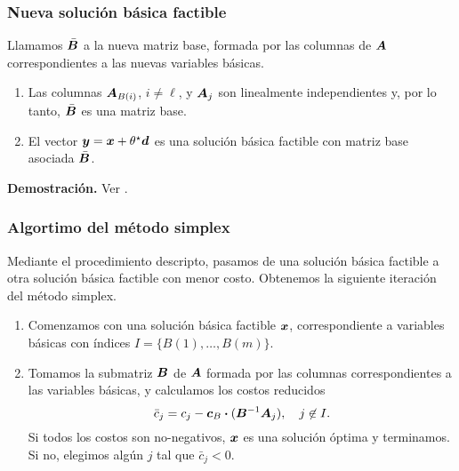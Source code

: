\documentclass[aspectratio=169,12pt,spanish]{beamer}
\newcounter{savedenum}
\newcommand*{\saveenum}{\setcounter{savedenum}{\theenumi}}
\begin{document}

\begin{frame}
\frametitle{Nueva solución básica factible}

Llamamos $\bar {\bm{B}}$ a la nueva matriz base, formada por las columnas de $\bm{A}$ correspondientes a las nuevas variables básicas.

\begin{theorem}
\begin{enumerate}
\item Las columnas $\bm{A}_{B(i)}$, $i \neq \ell$, y $\bm{A}_j$ son linealmente independientes y, por lo tanto, $\bar {\bm{B}}$ es una matriz base.
\item El vector $\bm{y} = \bm{x} + \theta^\star \bm{d}$ es una solución básica factible con matriz base asociada $\bar {\bm{B}}$.
\end{enumerate}
\end{theorem}

\textbf{Demostración.} Ver \cite[Teorema 3.2]{Bertsimas1997}.

\end{frame}


\begin{frame}
\frametitle{Algortimo del método simplex}

Mediante el procedimiento descripto, pasamos de una solución básica factible a otra solución básica factible con menor costo.
Obtenemos la siguiente iteración del método simplex.

\begin{enumerate}
\item Comenzamos con una solución básica factible $\bm{x}$, correspondiente a variables básicas con índices $I = \{B(1), \dots, B(m)\}$.
\item Tomamos la submatriz $\bm{B}$ de $\bm{A}$ formada por las columnas correspondientes a las variables básicas, y calculamos los costos reducidos
    $$\bar c_j = c_j - \bm{c}_B \boldsymbol{\cdot} (\bm{B}^{-1} \bm{A}_j), \quad j \not\in I.$$
Si todos los costos son no-negativos, $\bm{x}$ es una solución óptima y terminamos. Si no, elegimos algún $j$ tal que $\bar c_j < 0$.
\saveenum
\end{enumerate}

\end{frame}

\end{document}
